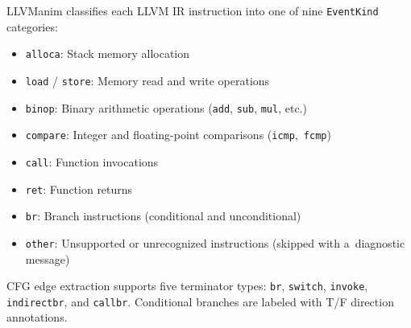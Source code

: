 LLVManim classifies each LLVM IR instruction into one of nine \texttt{EventKind} categories:

\begin{itemize}
    \item \texttt{alloca}: Stack memory allocation
    \item \texttt{load} / \texttt{store}: Memory read and write operations
    \item \texttt{binop}: Binary arithmetic operations (\texttt{add}, \texttt{sub}, \texttt{mul}, etc.)
    \item \texttt{compare}: Integer and floating-point comparisons (\texttt{icmp},~\texttt{fcmp})
    \item \texttt{call}: Function invocations
    \item \texttt{ret}: Function returns
    \item \texttt{br}: Branch instructions (conditional and unconditional)
    \item \texttt{other}: Unsupported or unrecognized instructions (skipped with a~diagnostic message)
\end{itemize}

CFG edge extraction supports five terminator types: \texttt{br}, \texttt{switch}, \texttt{invoke}, \texttt{indirectbr}, and \texttt{callbr}. Conditional branches are labeled with T/F direction annotations.
